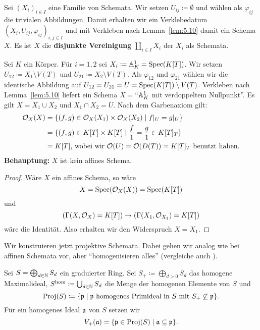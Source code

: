 \begin{bsp}
\label{bsp:5.12}
	Sei $(X_i)_{i\in I}$ eine Familie von Schemata. Wir setzen $U_{ij}\coloneqq \emptyset$ und wählen als $\varphi_{ij}$ die trivialen Abbildungen. Damit erhalten wir ein Verklebedatum $(X_i,U_{ij},\varphi_{ij})_{i,j\in I}$ und mit Verkleben nach Lemma~\ref{lem:5.10} damit ein Schema $X$. Es ist $X$ die \textbf{disjunkte Vereinigung} $\coprod_{i\in I}X_i$ der $X_i$ als Schemata.
\end{bsp}

\begin{bsp}
\label{bsp:5.13}
	Sei $K$ ein Körper. Für $i=1,2$ sei $X_i\coloneqq \mathbb {A}^1_K = \operatorname{Spec}(K[T])$. Wir setzen $U_{12} \coloneqq X_1 \setminus V(T)$ und $U_{21}\coloneqq X_2 \setminus V(T)$. Als $\varphi_{12}$ und $\varphi_{21}$ wählen wir die identische Abbildung auf $U_{12} = U_{21} = U = \operatorname{Spec}(K[T]) \setminus V(T)$. Verkleben nach Lemma~\ref{lem:5.10} liefert ein Schema $X=$\enquote{$\mathbb {A}^1_K$ mit verdoppeltem Nullpunkt}. Es gilt $X= X_1 \cup X_2$ und $X_1 \cap X_2 = U$. Nach dem Garbenaxiom gilt:
	\begin{align*}
		\mathcal{O}_X(X) &= \{(f,g) \in \mathcal{O}_X(X_1)\times \mathcal{O}_X(X_2) \mid f\vert_U = g\vert_U\}\\
		&=\{(f,g) \in K[T] \times K[T] \mid \frac{f}{1} = \frac{g}{1} \in K[T]_T\}\\
		&= K[T]\text{, wobei wir } \mathcal{O}(U) = \mathcal{O}(D(T)) = K[T]_T \text{ benutzt haben.}
	\end{align*}
	\textbf{Behauptung:} $X$ ist kein affines Schema.
	\begin{proof}
		Wäre $X$ ein affines Schema, so wäre
		\[
			X = \operatorname{Spec}(\mathcal{O}_X(X)) = \operatorname{Spec}(K[T])
		\]
		und
		\[
			(\Gamma(X,\mathcal{O}_X) = K[T]) \to (\Gamma(X_1,\mathcal{O}_{X_1}) = K[T])
		\]
		wäre die Identität. Also erhalten wir den Widerspruch $X = X_1$.
	\end{proof}
\end{bsp}

Wir konstruieren jetzt projektive Schemata. Dabei gehen wir analog wie bei affinen Schemata vor, aber \enquote{homogenisieren alles} (vergleiche auch \cite[11~Projektive Varietäten]{gubler2014vorlesungsskript}).

\begin{defn}
\label{defn:5.14}
	Sei $S = \bigoplus_{d\in \mathbb {N}} S_d$ ein graduierter Ring. Sei $S_+ \coloneqq \bigoplus_{d > 0}S_d$ das homogene Maximalideal, $S^{\text{hom}}\coloneqq \bigcup_{d\in \mathbb {N}}S_d$ die Menge der homogenen Elemente von $S$ und
	\[
		\operatorname{Proj}(S) \coloneqq \{\mathfrak{p} \mid \mathfrak{p} \text{ homogenes Primideal in } S \text{ mit } S_+ \not \subseteq \mathfrak{p}\}.
	\]
	Für ein homogenes Ideal $\mathfrak{a}$ von $S$ setzen wir
	\[
		V_+(\mathfrak{a}) = \{\mathfrak{p} \in \operatorname{Proj}(S) \mid \mathfrak{a} \subseteq \mathfrak{p}\}.
	\]
\end{defn}


